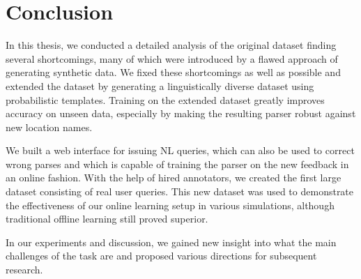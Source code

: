 \chapter{Conclusion}
\label{ch:conclusion}

In this thesis, we conducted a detailed analysis of the original \nlmapstwo{}
dataset finding several shortcomings, many of which were introduced by a flawed
approach of generating synthetic data. We fixed these shortcomings as well as
possible and extended the dataset by generating a linguistically diverse dataset
using probabilistic templates. Training on the extended dataset greatly improves
accuracy on unseen data, especially by making the resulting parser robust
against new location names.

We built a web interface for issuing NL queries, which can also be used to
correct wrong parses and which is capable of training the parser on the new
feedback in an online fashion. With the help of hired annotators, we created the
first large \nlmaps{} dataset consisting of real user queries. This new dataset
was used to demonstrate the effectiveness of our online learning setup in
various simulations, although traditional offline learning still proved
superior.

In our experiments and discussion, we gained new insight into what the main
challenges of the \nlmaps{} task are and proposed various directions for
subsequent research.

